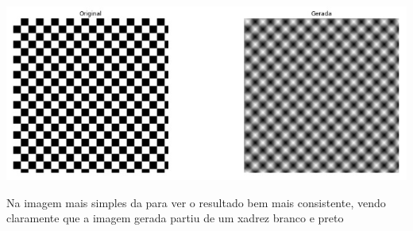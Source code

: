 \documentclass[a4paper, 12pt]{article}
\begin{document}
\begin{center}

\includegraphics[width= 16cm]{saida512_2.jpg}

\end{center}

Na imagem mais simples da para ver o resultado bem mais consistente, vendo claramente que a imagem gerada partiu de um xadrez branco e preto


\end{document}
